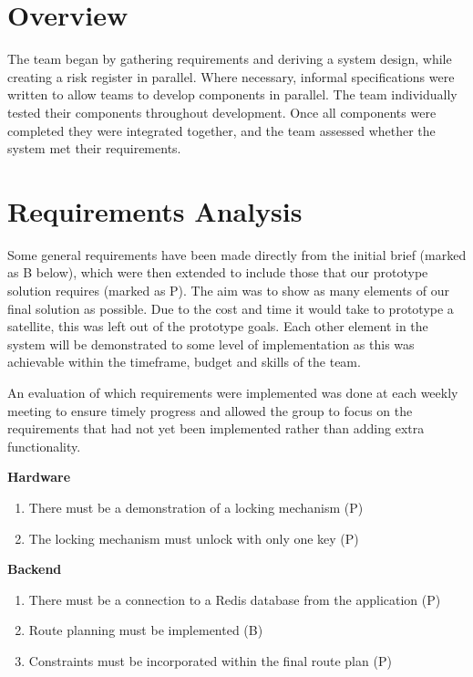

\section{Overview}
The team began by gathering requirements and deriving a system design, while creating a risk register in parallel. Where necessary, informal specifications were written to allow teams to develop components in parallel. The team individually tested their components throughout development. Once all components were completed they were integrated together, and the team assessed whether the system met their requirements.

\section{Requirements Analysis} \label{requirements}

Some general requirements have been made directly from the initial brief (marked as B below), which were then extended to include those that our prototype solution requires (marked as P). The aim was to show as many elements of our final solution as possible. Due to the cost and time it would take to prototype a satellite, this was left out of the prototype goals. Each other element in the system will be demonstrated to some level of implementation as this was achievable within the timeframe, budget and skills of the team. 

An evaluation of which requirements were implemented was done at each weekly meeting to ensure timely progress and allowed the group to focus on the requirements that had not yet been implemented rather than adding extra functionality. 
    
\textbf{Hardware}
\begin{enumerate}
\item There must be a demonstration of a locking mechanism (P)
\item The locking mechanism must unlock with only one key (P)
\end{enumerate}

\textbf{Backend}
\begin{enumerate}[resume]
\item There must be a connection to a Redis database from the application (P)
\item Route planning must be implemented (B)
\item Constraints must be incorporated within the final route plan (P)
\end{enumerate}

